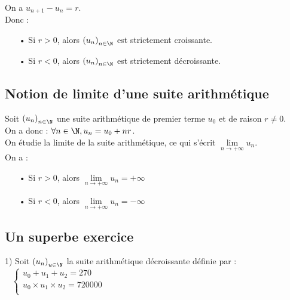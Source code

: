 On a  $u_{n+1} - u_{n} = r$. \\

Donc :

\begin{itemize}
\item[•] Si $r > 0$, alors $\left(u_n\right)_{n \in \N}$ est strictement croissante. 
\item[•] Si $r < 0$, alors $\left(u_n\right)_{n \in \N}$ est strictement décroissante. 
\end{itemize}

\subsection{Notion de limite d'une suite arithmétique}

Soit $\left(u_n\right)_{n \in \N}$ une suite arithmétique de premier terme $u_0$ et de raison $r \neq 0$. \\

On a donc : $\forall n \in \N, u_{n} = u_0 + nr$. \\

On étudie la limite de la suite arithmétique, ce qui s'écrit $\lim\limits_{n \to +\infty} u_n$. \\

On a : \\

\begin{itemize}
\item[•] Si $r > 0$, alors $\lim\limits_{n \to +\infty} u_n = +\infty$ 
\item[•] Si $r < 0$, alors $\lim\limits_{n \to +\infty} u_n = -\infty$ 
\end{itemize}

\vspace*{-5cm}

\newpage

\vspace*{-1cm}

\subsection{Un superbe exercice}

1) Soit $\left(u_n\right)_{u \in \N}$ la suite arithmétique décroissante définie par :$ \; \; \; \begin{cases}
u_0 + u_1 + u_2 = 270 \\
u_0 \times u_1 \times u_2 = 720 000 \\
\end{cases}$ \\

